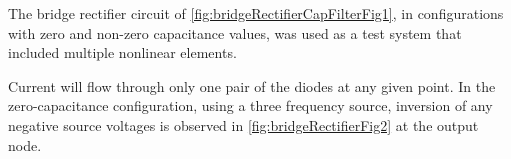 


The bridge rectifier circuit of
\cref{fig:bridgeRectifierCapFilterFig1}, in configurations with zero and non-zero capacitance values, 
was used as a test system that included multiple nonlinear elements.


Current will flow through only one pair of the diodes at any given point.
In the zero-capacitance configuration, using a three frequency source, inversion of any negative source voltages is observed in \cref{fig:bridgeRectifierFig2} at the output node.



